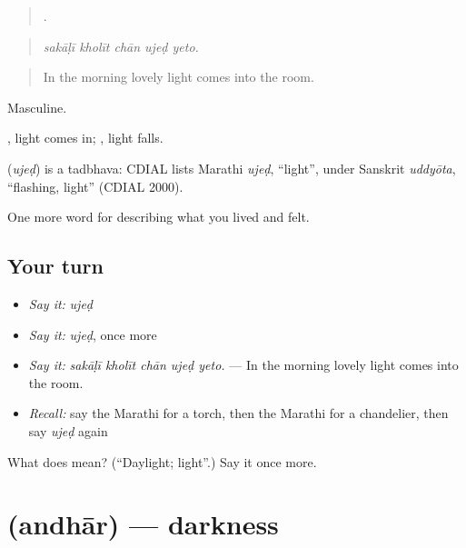 \begin{quote}
    .
\end{quote}

\begin{quote}
\emph{sakāḷī kholīt chān ujeḍ yeto.}
\end{quote}

\begin{quote}
In the morning lovely light comes into the room.
\end{quote}

Masculine.

 , light comes in;  , light falls.

\begin{cousinweb}
\textbf{} (\emph{ujeḍ}) is a tadbhava: CDIAL lists Marathi \emph{ujeḍ}, \textquotedblleft{}light\textquotedblright{}, under Sanskrit \emph{uddyōta}, \textquotedblleft{}flashing, light\textquotedblright{} (CDIAL 2000).
\end{cousinweb}

\begin{grammarlens}[title={What you've built}]
One more word for describing what you lived and felt.
\end{grammarlens}

\subsection*{Your turn}
\begin{itemize}
\raggedright
  \item \emph{Say it:} \emph{ujeḍ}
  \item \emph{Say it:} \emph{ujeḍ}, once more
  \item \emph{Say it:} \emph{sakāḷī kholīt chān ujeḍ yeto.} — In the morning lovely light comes into the room.
  \item \emph{Recall:} say the Marathi for a torch, then the Marathi for a chandelier, then say \emph{ujeḍ} again
\end{itemize}

\begin{tcolorbox}[breakable,colback=teal!4,colframe=teal!35!black,title={Before you move on}]
What does  mean? (\textquotedblleft{}Daylight; light\textquotedblright{}.) Say it once more.
\end{tcolorbox}
\section[\texorpdfstring{\mr{अंधार} (andhār)}{अंधार (andhār)}]{ (andhār) — darkness}

